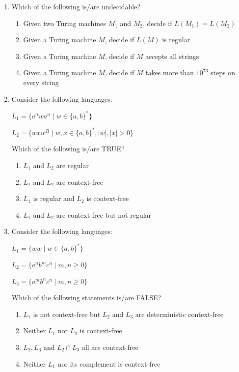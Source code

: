 \begin{enumerate}
\hfill{}

\item Which of the following is/are undecidable?  

\begin{enumerate}
\item Given two Turing machines $M_1$ and $M_2$, decide if $L(M_1)=L(M_2)$
\item Given a Turing machine $M$, decide if $L(M)$ is regular
\item Given a Turing machine $M$, decide if $M$ accepts all strings
\item Given a Turing machine $M$, decide if $M$ takes more than $10^{73}$ steps on every string
\end{enumerate}

\hfill{}

\item Consider the following languages:  

$L_1=\{a^nwa^n \mid w \in \{a,b\}^*\}$  

$L_2=\{wxw^R \mid w,x \in \{a,b\}^*, |w|,|x|>0\}$  

Which of the following is/are TRUE?  

\begin{enumerate}
\item $L_1$ and $L_2$ are regular
\item $L_1$ and $L_2$ are context-free
\item $L_1$ is regular and $L_2$ is context-free
\item $L_1$ and $L_2$ are context-free but not regular
\end{enumerate}

\hfill{}

\item Consider the following languages:  

$L_1=\{ww \mid w \in \{a,b\}^*\}$  

$L_2=\{a^n b^m c^n \mid m,n \geq 0\}$  

$L_3=\{a^m b^n c^n \mid m,n \geq 0\}$  

Which of the following statements is/are FALSE?  

\begin{enumerate}
\item $L_1$ is not context-free but $L_2$ and $L_3$ are deterministic context-free
\item Neither $L_1$ nor $L_2$ is context-free
\item $L_2,L_3$ and $L_2 \cap L_3$ all are context-free
\item Neither $L_1$ nor its complement is context-free
\end{enumerate}


\end{enumerate}
